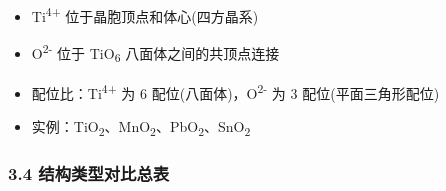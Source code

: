 \begin{itemize}
\tightlist
\item
  Ti\textsuperscript{4+} 位于晶胞顶点和体心(四方晶系)
\item
  O\textsuperscript{2-} 位于 TiO\textsubscript{6} 八面体之间的共顶点连接
\item
  配位比：Ti\textsuperscript{4+} 为 6 配位(八面体)，O\textsuperscript{2-} 为 3 配位(平面三角形配位)
\item
  实例：TiO\textsubscript{2}、MnO\textsubscript{2}、PbO\textsubscript{2}、SnO\textsubscript{2}
\end{itemize}

\subsubsection{3.4 结构类型对比总表}\label{ux7ed3ux6784ux7c7bux578bux5bf9ux6bd4ux603bux8868}

